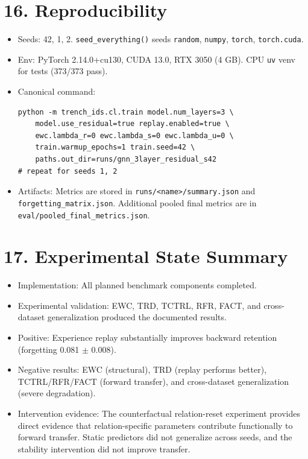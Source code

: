 \documentclass[11pt,a4paper]{article}
\begin{document}
\section*{16. Reproducibility}
\begin{itemize}[leftmargin=*]
\item Seeds: 42, 1, 2. \texttt{seed\_everything()} seeds \texttt{random}, \texttt{numpy}, \texttt{torch}, \texttt{torch.cuda}.
\item Env: PyTorch 2.14.0+cu130, CUDA 13.0, RTX 3050 (4 GB). CPU \texttt{uv} venv for tests (373/373 pass).
\item Canonical command:
\begin{verbatim}
python -m trench_ids.cl.train model.num_layers=3 \
    model.use_residual=true replay.enabled=true \
    ewc.lambda_r=0 ewc.lambda_s=0 ewc.lambda_u=0 \
    train.warmup_epochs=1 train.seed=42 \
    paths.out_dir=runs/gnn_3layer_residual_s42
# repeat for seeds 1, 2
\end{verbatim}
\item Artifacts: Metrics are stored in \texttt{runs/<name>/summary.json} and \texttt{forgetting\_matrix.json}.
Additional pooled final metrics are in \texttt{eval/pooled\_final\_metrics.json}.
\end{itemize}

\section*{17. Experimental State Summary}
\begin{itemize}[leftmargin=*]
\item Implementation: All planned benchmark components completed.
\item Experimental validation: EWC, TRD, TCTRL, RFR, FACT, and cross-dataset generalization produced the documented results.
\item Positive: Experience replay substantially improves backward retention (forgetting \num{0.081} $\pm$ \num{0.008}).
\item Negative results: EWC (structural), TRD (replay performs better), TCTRL/RFR/FACT (forward transfer), and cross-dataset generalization (severe degradation).
\item Intervention evidence: The counterfactual relation-reset experiment provides direct evidence that relation-specific parameters contribute functionally to forward transfer. Static predictors did not generalize across seeds, and the stability intervention did not improve transfer.
\end{itemize}
\end{document}
